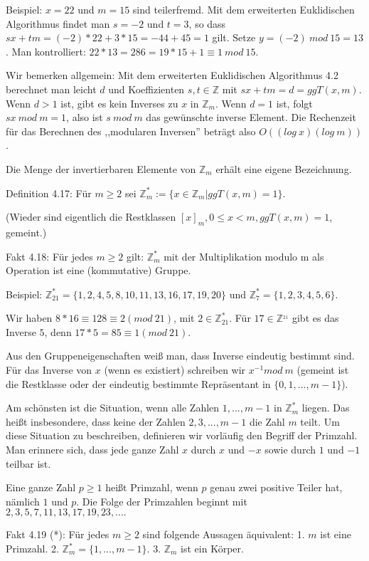 \documentclass[a4paper]{article}
\begin{document}
\begin{multicols}{3}
Beispiel: $x=22$ und $m=15$ sind teilerfremd. Mit dem erweiterten Euklidischen Algorithmus findet man $s=-2$ und $t=3$, so dass $sx+tm=(-2)*22 + 3*15 =-44 + 45 = 1$ gilt. Setze $y=(-2)\ mod\ 15 = 13$. Man kontrolliert: $22*13 =286=19 *15 + 1\equiv 1\ mod\ 15$.

Wir bemerken allgemein: Mit dem erweiterten Euklidischen Algorithmus 4.2 berechnet man leicht $d$ und Koeffizienten $s,t\in\mathbb{Z}$ mit $sx+tm= d= ggT(x,m)$. Wenn $d>1$ ist, gibt es kein Inverses zu $x$ in $\mathbb{Z}_m$. Wenn $d=1$ ist, folgt $sx\ mod\ m=1$, also ist $s\ mod\ m$ das gewünschte inverse Element. Die Rechenzeit für das Berechnen des ,,modularen Inversen'' beträgt also $O((log\ x)(log\ m))$.

Die Menge der invertierbaren Elemente von $\mathbb{Z}_m$ erhält eine eigene Bezeichnung.

Definition 4.17: Für $m\geq 2$ sei $\mathbb{Z}^*_m:=\{x\in\mathbb{Z}_m| ggT(x,m)=1\}$.

(Wieder sind eigentlich die Restklassen $[x]_m, 0\leq x < m, ggT(x,m) = 1$, gemeint.)

Fakt 4.18: Für jedes $m\geq 2$ gilt: $\mathbb{Z}^*_m$ mit der Multiplikation modulo m als Operation ist eine (kommutative) Gruppe.

Beispiel: $\mathbb{Z}^*_{21}=\{1,2,4,5,8,10,11,13,16,17,19,20\}$ und $\mathbb{Z}^*_7=\{1,2,3,4,5,6\}$.

Wir haben $8*16 \equiv 128 \equiv 2 (mod\ 21)$, mit $2\in\mathbb{Z}^*_{21}$. Für $17\in\mathbb{Z}^_{21}$ gibt es das Inverse $5$, denn $17*5 = 85\equiv 1 (mod\ 21)$.

Aus den Gruppeneigenschaften weiß man, dass Inverse eindeutig bestimmt sind. Für das Inverse von $x$ (wenn es existiert) schreiben wir $x^{-1} mod\ m$ (gemeint ist die Restklasse oder der eindeutig bestimmte Repräsentant in $\{0,1 ,...,m-1\}$).

Am schönsten ist die Situation, wenn alle Zahlen $1,...,m-1$ in $\mathbb{Z}^*_m$ liegen. Das heißt insbesondere, dass keine der Zahlen $2, 3 ,...,m-1$ die Zahl $m$ teilt. Um diese Situation zu beschreiben, definieren wir vorläufig den Begriff der Primzahl. Man erinnere sich, dass jede ganze Zahl $x$ durch $x$ und $-x$ sowie durch $1$ und $-1$ teilbar ist.

Eine ganze Zahl $p\geq 1$ heißt Primzahl, wenn $p$ genau zwei positive Teiler hat, nämlich $1$ und $p$. Die Folge der Primzahlen beginnt mit $2, 3 , 5 , 7 , 11 , 13 , 17 , 19 , 23 ,....$

Fakt 4.19 (*): Für jedes $m\geq 2$ sind folgende Aussagen äquivalent:
1. $m$ ist eine Primzahl.
2. $\mathbb{Z}^*_m=\{ 1 ,...,m-1\}$.
3. $\mathbb{Z}_m$ ist ein Körper.


\end{multicols}
\end{document}
